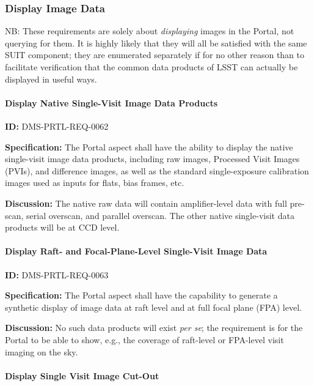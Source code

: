 \documentclass[SE,toc,lsstdraft]{lsstdoc}
\begin{document}
\subsubsection{Display Image Data}

NB: These requirements are solely about \textit{displaying} images in the Portal, not querying for them. It is highly likely that they will all be satisfied with the same SUIT component; they are enumerated separately if for no other reason than to facilitate verification that the common data products of LSST can actually be displayed in useful ways.

\paragraph{Display Native Single-Visit Image Data Products}\hfill  %

\label{DMS-PRTL-REQ-0062}
\textbf{ID:} DMS-PRTL-REQ-0062

\textbf{Specification:}
The Portal aspect shall have the ability to display the native single-visit image data products, including raw images, Processed Visit Images (PVIs), and difference images, as well as the standard single-exposure calibration images used as inputs for flats, bias frames, etc.

\textbf{Discussion:}
The native raw data will contain amplifier-level data with full pre-scan, serial overscan, and parallel overscan.
The other native single-visit data products will be at CCD level.

\paragraph{Display Raft- and Focal-Plane-Level Single-Visit  Image Data}\hfill  %

\label{DMS-PRTL-REQ-0063}
\textbf{ID:} DMS-PRTL-REQ-0063

\textbf{Specification:}
The Portal aspect shall have the capability to generate a synthetic display of image data at raft level and at full focal plane (FPA) level.

\textbf{Discussion:}
No such data products will exist \textit{per se}; the requirement is for the Portal to be able to show, e.g., the coverage of raft-level or FPA-level visit imaging on the sky.

\paragraph{Display Single Visit Image Cut-Out}\hfill  %
\end{document}
